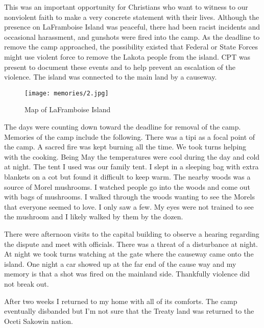 This was an important opportunity for Christians who want to witness to our nonviolent faith to make a very concrete statement with their lives.
Although the presence on LaFramboise Island was peaceful, there had been racist incidents and occasional harassment, and gunshots were fired into the camp.
As the deadline to remove the camp approached, the possibility existed that Federal or State Forces might use violent force to remove the Lakota people from the island.
CPT was present to document these events and to help prevent an escalation of the violence.
The island was connected to the main land by a causeway.

\begin{figure}
\centering
\texttt{[image: memories/2.jpg]}
\caption{
Map of LaFramboise Island
}
\end{figure}

The days were counting down toward the deadline for removal of the camp.
Memories of the camp include the following.
There was a tipi as a focal point of the camp.
A sacred fire was kept burning all the time.
We took turns helping with the cooking.
Being May the temperatures were cool during the day and cold at night.
The tent I used was our family tent.
I slept in a sleeping bag with extra blankets on a cot but found it difficult to keep warm.
The nearby woods was a source of Morel mushrooms.
I watched people go into the woods and come out with bags of mushrooms.
I walked through the woods wanting to see the Morels that everyone seemed to love.
I only saw a few.
My eyes were not trained to see the mushroom and I likely walked by them by the dozen.

There were afternoon visits to the capital building to observe a hearing regarding the dispute and meet with officials.
There was a threat of a disturbance at night.
At night we took turns watching at the gate where the causeway came onto the island.
One night a car showed up at the far end of the cause way and my memory is that a shot was fired on the mainland side.
Thankfully violence did not break out.

After two weeks I returned to my home with all of its comforts.
The camp eventually disbanded but I'm not sure that the Treaty land was returned to the Oceti Sakowin nation.


